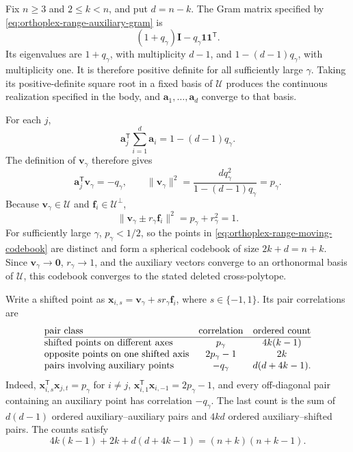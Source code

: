 \documentclass[12pt,draftclsnofoot,onecolumn]{IEEEtran}
\newcommand{\bx}{\bm x}
\newcommand{\bv}{\bm v}
\newcommand{\ba}{\bm a}
\newcommand{\bI}{\mathbf I}
\newcommand{\bzero}{\bm 0}
\theoremstyle{definition}
\begin{document}
\begin{IEEEproof}
Fix \(n\ge3\) and \(2\le k<n\), and put \(d=n-k\).  The Gram matrix
specified by \eqref{eq:orthoplex-range-auxiliary-gram} is
\[
  (1+q_\gamma)\bI-q_\gamma\bm 1\bm 1^{\mathsf T}.
\]
Its eigenvalues are \(1+q_\gamma\), with multiplicity \(d-1\), and
\(1-(d-1)q_\gamma\), with multiplicity one.  It is therefore positive
definite for all sufficiently large \(\gamma\).  Taking its
positive-definite square root in a fixed basis of \(\mathcal U\)
produces the continuous realization specified in the body, and
\(\ba_1,\ldots,\ba_d\) converge to that basis.

For each \(j\),
\[
  \ba_j^{\mathsf T}\sum_{i=1}^d\ba_i
  =1-(d-1)q_\gamma.
\]
The definition of \(\bv_\gamma\) therefore gives
\[
  \ba_j^{\mathsf T}\bv_\gamma=-q_\gamma,
  \qquad
  \|\bv_\gamma\|^2
  =\frac{dq_\gamma^2}{1-(d-1)q_\gamma}
  =p_\gamma.
\]
Because \(\bv_\gamma\in\mathcal U\) and
\(\bm f_i\in\mathcal U^\perp\),
\[
  \|\bv_\gamma\pm r_\gamma\bm f_i\|^2
  =p_\gamma+r_\gamma^2=1.
\]
For sufficiently large \(\gamma\), \(p_\gamma<1/2\), so the points in
\eqref{eq:orthoplex-range-moving-codebook} are distinct and form a
spherical codebook of size \(2k+d=n+k\).  Since
\(\bv_\gamma\to\bzero\), \(r_\gamma\to1\), and the auxiliary vectors
converge to an orthonormal basis of \(\mathcal U\), this codebook
converges to the stated deleted cross-polytope.

Write a shifted point as
\(\bx_{i,s}=\bv_\gamma+s r_\gamma\bm f_i\), where
\(s\in\{-1,1\}\).  Its pair correlations are
\[
\begin{array}{@{}lcc@{}}
\text{pair class} & \text{correlation} & \text{ordered count}\\
\hline
\text{shifted points on different axes}
  & p_\gamma & 4k(k-1)\\
\text{opposite points on one shifted axis}
  & 2p_\gamma-1 & 2k\\
\text{pairs involving auxiliary points}
  & -q_\gamma & d(d+4k-1).
\end{array}
\]
Indeed,
\(\bx_{i,s}^{\mathsf T}\bx_{j,t}=p_\gamma\) for \(i\ne j\),
\(\bx_{i,1}^{\mathsf T}\bx_{i,-1}=2p_\gamma-1\), and every
off-diagonal pair containing an auxiliary point has correlation
\(-q_\gamma\).  The last count is the sum of \(d(d-1)\) ordered
auxiliary--auxiliary pairs and \(4kd\) ordered
auxiliary--shifted pairs.  The counts satisfy
\begin{equation}
  4k(k-1)+2k+d(d+4k-1)
  =(n+k)(n+k-1).
  \label{eq:orthoplex-range-pair-count-check}
\end{equation}


\end{IEEEproof}
\end{document}
